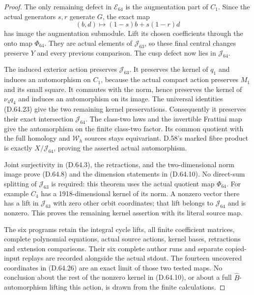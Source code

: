 \begin{proof}
The only remaining defect
in \(\mathcal E_{64}\) is the augmentation
part of \(C_1\). Since the actual generators
\(s,r\) generate \(G\), the exact map
\[
        (b,d)\longmapsto(1-s)b+s(1-r)d
 \tag{D.64.30}
\]
has image the augmentation submodule. Lift its
chosen coefficients through the onto map
\(\Phi_{64}\). They are actual elements of
\(\mathcal J_{63}\), so these final central
changes preserve \(Y\) and every previous
comparison. The cusp defect now lies in
\(\mathcal J_{64}\).

The induced exterior action preserves
\(\mathcal J_{63}\). It preserves the kernel
of \(q_1\) and induces an automorphism on
\(C_1\), because the actual compact action
preserves \(M_1\) and its small square.
It commutes with the norm, hence preserves
the kernel of \(\nu_4q_4\) and induces an
automorphism on its image. The universal
identities (D.64.23) give the two remaining
kernel preservations. Consequently it
preserves their exact intersection
\(\mathcal J_{64}\). The class-two laws and
the invertible Frattini map give the automorphism
on the finite class-two factor. Its common
quotient with the full homology and
\(\mathcal W_h\) sources stays equivariant.
D.58's marked fibre product is exactly
\(X/\mathcal J_{64}\), proving the asserted
actual automorphism.

Joint surjectivity in (D.64.3), the retractions,
and the two-dimensional norm image prove
(D.64.8) and the dimension statements in
(D.64.10). No direct-sum splitting of
\(\mathcal J_{63}\) is required: this theorem
uses the actual quotient map \(\Phi_{64}\).
For example \(C_4\) has a 1918-dimensional
kernel of its norm. A nonzero vector there
has a lift in \(\mathcal J_{63}\) with zero
other orbit coordinates; that lift belongs
to \(\mathcal J_{64}\) and is nonzero.
This proves the remaining kernel assertion
with its literal source map.

The six programs retain the integral cycle lifts,
all finite coefficient matrices, complete polynomial
equations, actual source actions, kernel bases,
retractions and extension comparisons. Their
six complete author runs and separate copied-input
replays are recorded alongside the actual stdout.
The fourteen uncovered coordinates in (D.64.26)
are an exact limit of those two tested maps.
No conclusion about the rest of the nonzero
kernel in (D.64.10), or about a full
\(\widehat B\)-automorphism lifting this action,
is drawn from the finite calculations.
\end{proof}
